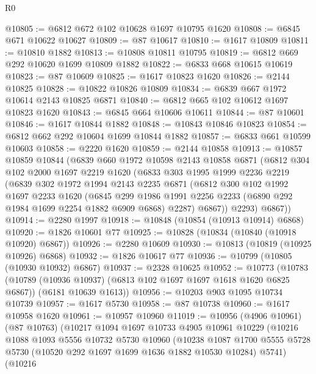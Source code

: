 \begin{lexlean}{R0}
\begin{coremodule}
@10805 := @6812 @672 @102 @10628 @1697 @10795 @1620
@10808 := @6845 @671 @10622 @10627
@10809 := @87 @10617
@10810 := @1617 @10809
@10811 := @10810 @1882
@10813 := @10808 @10811 @10795
@10819 := @6812 @669 @292 @10620 @1699 @10809 @1882
@10822 := @6833 @668 @10615 @10619
@10823 := @87 @10609
@10825 := @1617 @10823 @1620
@10826 := @2144 @10825
@10828 := @10822 @10826 @10809
@10834 := @6839 @667 @1972 @10614 @2143 @10825 @6871
@10840 := @6812 @665 @102 @10612 @1697 @10823 @1620
@10843 := @6845 @664 @10606 @10611
@10844 := @87 @10601
@10846 := @1617 @10844 @1882
@10848 := @10843 @10846 @10823
@10854 := @6812 @662 @292 @10604 @1699 @10844 @1882
@10857 := @6833 @661 @10599 @10603
@10858 := @2220 @1620
@10859 := @2144 @10858
@10913 := @10857
    @10859
    @10844
    (@6839
      @660
      @1972
      @10598
      @2143
      @10858
      @6871
      (@6812
        @304
        @102
        @2000
        @1697
        @2219
        @1620
        (@6833
          @303
          @1995
          @1999
          @2236
          @2219
          (@6839
            @302
            @1972
            @1994
            @2143
            @2235
            @6871
            (@6812
              @300
              @102
              @1992
              @1697
              @2233
              @1620
              (@6845
                @299
                @1986
                @1991
                @2256
                @2233
                (@6890 @292 @1984 @1699 @2254 @1882 @6909 @6868)
                @2287)
              @6867))
          @2293)
        @6867))
@10914 := @2280 @1997
@10918 := @10848 (@10854 (@10913 @10914) @6868)
@10920 := @1826 @10601 @77
@10925 := @10828 (@10834 (@10840 (@10918 @10920) @6867))
@10926 := @2280 @10609
@10930 := @10813 (@10819 (@10925 @10926) @6868)
@10932 := @1826 @10617 @77
@10936 := @10799 (@10805 (@10930 @10932) @6867)
@10937 := @2328 @10625
@10952 := @10773
    (@10783
      (@10789 (@10936 @10937) (@6813 @102 @1697 @1697 @1618 @1620 @6825 @6867))
      (@6181 @10639 @1613))
@10956 := @10203 @903 @1095 @10734 @10739
@10957 := @1617 @5730
@10958 := @87 @10738
@10960 := @1617 @10958 @1620
@10961 := @10957 @10960
@11019 := @10956
    (@4906 @10961)
    (@87 @10763)
    (@10217
      @1094
      @1697
      @10733
      @4905
      @10961
      @10229
      (@10216
        @1088
        @1093
        @5556
        @10732
        @5730
        @10960
        (@10238
          @1087
          @1700
          @5555
          @5728
          @5730
          (@10520 @292 @1697 @1699 @1636 @1882 @10530 @10284)
          @5741)
        (@10216

\end{coremodule}
\end{lexlean}
